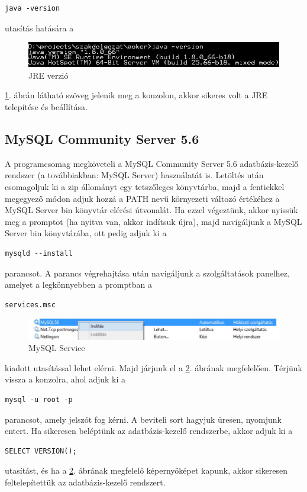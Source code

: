 \begin{verbatim}
java -version
\end{verbatim}
utasítás hatására a
\begin{figure}[h!]
  \caption{JRE verzió}
  \label{fig:jre_version}
  \centering
    \includegraphics{user-documentation/images/java_version.jpg}
\end{figure}
 \ref{fig:jre_version}. ábrán látható szöveg jelenik meg a konzolon, akkor sikeres volt a JRE telepítése és beállítása.
 
 \subsection{MySQL Community Server 5.6}
 A programcsomag megköveteli a MySQL Community Server 5.6 adatbázis-kezelő rendszer \cite{mysqlsite} (a továbbiakban: MySQL Server) használatát is. Letöltés után csomagoljuk ki a zip állományt egy tetszőleges könyvtárba, majd a fentiekkel megegyező módon adjuk hozzá a PATH nevű környezeti változó értékéhez a MySQL Server bin könyvtár elérési útvonalát. Ha ezzel végeztünk, akkor nyissük meg a promptot (ha nyitva van, akkor indítsuk újra), majd navigáljunk a MySQL Server bin könyvtárába, ott pedig adjuk ki a
 \begin{verbatim}
mysqld --install
\end{verbatim}
parancsot. A parancs végrehajtása után navigáljunk a szolgáltatások panelhez, amelyet a legkönnyebben a promptban a
 \begin{verbatim}
services.msc
\end{verbatim}
\begin{figure}[h!]
  \caption{MySQL Service}
  \label{fig:mysql_service}
  \centering
    \includegraphics{user-documentation/images/mysql_service.jpg}
\end{figure}
kiadott utasítással lehet elérni. Majd járjunk el a \ref{fig:mysql_service}. ábrának megfelelően. Térjünk vissza a konzolra, ahol adjuk ki a 
 \begin{verbatim}
mysql -u root -p
\end{verbatim}
parancsot, amely jelszót fog kérni. A beviteli sort hagyjuk üresen, nyomjunk entert. Ha sikeresen beléptünk az adatbázis-kezelő rendszerbe, akkor adjuk ki a
 \begin{verbatim}
SELECT VERSION();
\end{verbatim}
utasítást, és ha a \ref{fig:mysql_service}. ábrának megfelelő képernyőképet kapunk, akkor sikeresen feltelepítettük az adatbázis-kezelő rendszert.

